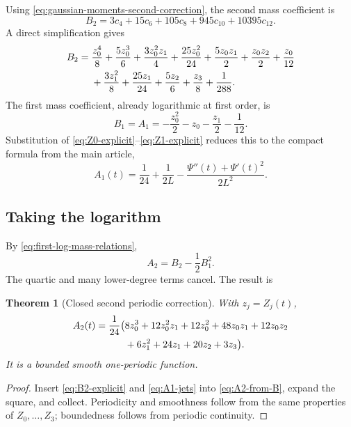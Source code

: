 \documentclass[11pt,oneside]{article}
\newtheorem{theorem}{Theorem}[section]
\theoremstyle{definition}
\theoremstyle{remark}
\begin{document}
Using \eqref{eq:gaussian-moments-second-correction}, the second mass coefficient is
\begin{equation}
 B_2=3c_4+15c_6+105c_8+945c_{10}+10395c_{12}.
 \label{eq:B2-contraction}
\end{equation}
A direct simplification gives
\begin{align}
 B_2={}&\frac{z_0^4}{8}+\frac{5z_0^3}{6}
 +\frac{3z_0^2z_1}{4}+\frac{25z_0^2}{24}
 +\frac{5z_0z_1}{2}+\frac{z_0z_2}{2}+\frac{z_0}{12}
 \notag\\
 &+\frac{3z_1^2}{8}+\frac{25z_1}{24}
 +\frac{5z_2}{6}+\frac{z_3}{8}+\frac1{288}.                \label{eq:B2-explicit}
\end{align}
The first mass coefficient, already logarithmic at first order, is
\begin{equation}
 B_1=A_1=-\frac{z_0^2}{2}-z_0-\frac{z_1}{2}-\frac1{12}.
 \label{eq:A1-jets}
\end{equation}
Substitution of \eqref{eq:Z0-explicit}--\eqref{eq:Z1-explicit} reduces this to the compact
formula from the main article,
\begin{equation}
 A_1(t)=\frac1{24}+\frac1{2L}
 -\frac{\Psi''(t)+\Psi'(t)^2}{2L^2}.
 \label{eq:A1-Psi}
\end{equation}

\subsection{Taking the logarithm}

By \eqref{eq:first-log-mass-relations},
\begin{equation}
 A_2=B_2-\frac12B_1^2.
 \label{eq:A2-from-B}
\end{equation}
The quartic and many lower-degree terms cancel.  The result is

\begin{theorem}[Closed second periodic correction]
\label{thm:closed-second-correction}
With $z_j=Z_j(t)$,
\begin{align}
 A_2(t)=\frac1{24}\bigl(&8z_0^3+12z_0^2z_1+12z_0^2
 +48z_0z_1+12z_0z_2\notag\\
 &+6z_1^2+24z_1+20z_2+3z_3\bigr).                          \label{eq:A2-jets}
\end{align}
It is a bounded smooth one-periodic function.
\end{theorem}

\begin{proof}
Insert \eqref{eq:B2-explicit} and \eqref{eq:A1-jets} into
\eqref{eq:A2-from-B}, expand the square, and collect.  Periodicity and smoothness follow from
the same properties of $Z_0,\ldots,Z_3$; boundedness follows from periodic continuity.
\end{proof}
\end{document}
